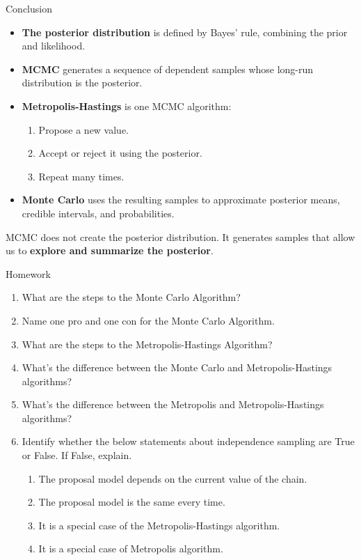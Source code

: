\documentclass[aspectratio=43,11pt]{beamer}
\begin{document}
\begin{frame}{Conclusion}
\begin{itemize}
    \setlength{\itemsep}{0.3cm}

    \item \textbf{The posterior distribution} is defined
    by Bayes' rule, combining the prior and likelihood.

    \item \textbf{MCMC} generates a sequence of dependent
    samples whose long-run distribution is the posterior.

    \item \textbf{Metropolis-Hastings} is one MCMC algorithm:
    \begin{enumerate}
        \item Propose a new value.
        \item Accept or reject it using the posterior.
        \item Repeat many times.
    \end{enumerate}

    \item \textbf{Monte Carlo} uses the resulting samples
    to approximate posterior means, credible intervals,
    and probabilities.
\end{itemize}

\vspace{0.2cm}
MCMC does not create the posterior distribution.
It generates samples that allow us to
\textbf{explore and summarize the posterior}.
\end{frame}

\begin{frame}{Homework}
\begin{enumerate}
\item What are the steps to the Monte Carlo Algorithm?
\item Name one pro and one con for the Monte Carlo Algorithm.
\item What are the steps to the Metropolis-Hastings Algorithm?
\item What’s the difference between the Monte Carlo and Metropolis-Hastings algorithms?
\item What’s the difference between the Metropolis and Metropolis-Hastings algorithms?
\item Identify whether the below statements about independence sampling are True or False. If False, explain.
\begin{enumerate}
\item The proposal model depends on the current value of the chain.
\item The proposal model is the same every time.
\item It is a special case of the Metropolis-Hastings algorithm.
\item It is a special case of Metropolis algorithm.
\end{enumerate}
\end{enumerate}
\end{frame}
\end{document}
